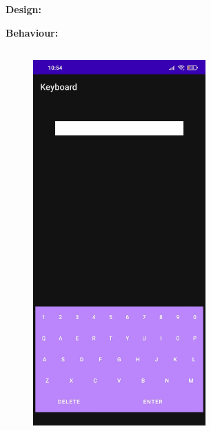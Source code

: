 \documentclass[12pt,letterpaper]{article}
\begin{document}
\subsubsection*{}
\textbf{Design:}
\begin{flushleft}

\end{flushleft}
\textbf{Behaviour:}
\begin{flushleft}

\end{flushleft}

\newpage
\subsection*{}
\begin{figure}[h]
    \centering
    \includegraphics[height=14cm, keepaspectratio]{Keyboard/Outputs/OP4.jpeg}
\end{figure}
\end{document}
